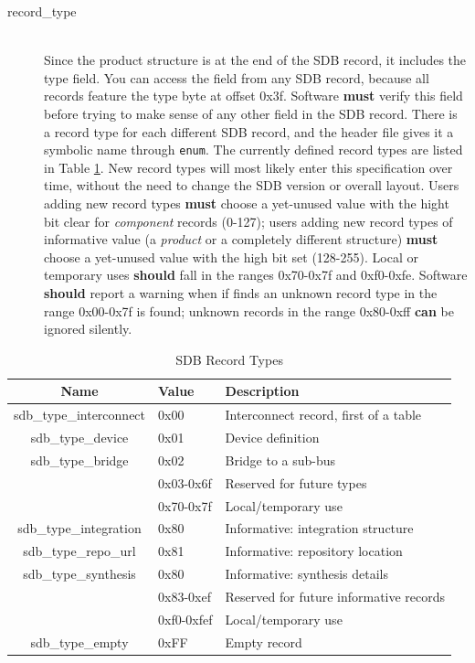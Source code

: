 \documentclass[a4paper, 12pt]{article}
\begin{document}
\begin{description}
\item[record\_type] \hfill \\
Since the product structure is at the end of the SDB record, it includes the
type field. You can access the field from any SDB record, because all records feature
the type byte at offset 0x3f.  Software \textbf{must} verify this field before trying to
make sense of any other field in the SDB record.
There is a record type for each different
SDB record, and the header file gives it a symbolic name through \texttt{enum}.
The currently defined record types are listed in Table \ref{record_type}.  New
record types will most likely enter this specification over time, without the need
to change the SDB version or overall layout.  Users adding new record types \textbf{must}
choose a yet-unused value with the hight bit clear for \textit{component} records (0-127);
users adding new record types of informative value (a \textit{product} or a completely
different structure) \textbf{must} choose a yet-unused value with the high bit set (128-255).
Local or temporary uses \textbf{should} fall in the ranges 0x70-0x7f and 0xf0-0xfe.
Software \textbf{should} report a warning when if finds an
unknown record type in the range 0x00-0x7f is found; unknown records in the range 0x80-0xff
\textbf{can} be ignored silently.
\end{description}

\begin{center}
  \begin{savenotes}
    \begin{table}[!ht]\footnotesize
      \caption{SDB Record Types}\label{record_type}\centering
        \begin{tabular}{| c | l | p{6cm} |} \hline
        Name & Value & Description \\ \hline
        sdb\_type\_interconnect & 0x00 & Interconnect record, first of a table \\ \hline
        sdb\_type\_device & 0x01 & Device definition \\ \hline
        sdb\_type\_bridge & 0x02 & Bridge to a sub-bus \\ \hline
        & 0x03-0x6f & Reserved for future types \\ \hline
        & 0x70-0x7f & Local/temporary use \\ \hline
        sdb\_type\_integration & 0x80 & Informative: integration structure \\ \hline
        sdb\_type\_repo\_url & 0x81 & Informative: repository location \\ \hline
        sdb\_type\_synthesis & 0x80 & Informative: synthesis details \\ \hline
        & 0x83-0xef & Reserved for future informative records \\ \hline
        & 0xf0-0xfef & Local/temporary use \\ \hline
        sdb\_type\_empty & 0xFF & Empty record \\ \hline
        \end{tabular}
    \end{table}
  \end{savenotes}
\end{center}
\end{document}
